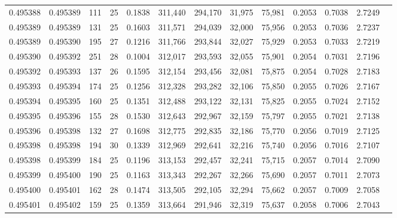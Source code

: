 \begin{tabular}{rrrrrrrrrrrrr}
0.495388 & 0.495389 & 111 &  25 &                                     0.1838 & 311,440 & 294,170 &  31,975 &  75,981 & 0.2053 & 0.7038 & 2.7249 \\
0.495389 & 0.495389 & 131 &  25 &                                     0.1603 & 311,571 & 294,039 &  32,000 &  75,956 & 0.2053 & 0.7036 & 2.7237 \\
0.495389 & 0.495390 & 195 &  27 &                                     0.1216 & 311,766 & 293,844 &  32,027 &  75,929 & 0.2053 & 0.7033 & 2.7219 \\
0.495390 & 0.495392 & 251 &  28 &                                     0.1004 & 312,017 & 293,593 &  32,055 &  75,901 & 0.2054 & 0.7031 & 2.7196 \\
0.495392 & 0.495393 & 137 &  26 &                                     0.1595 & 312,154 & 293,456 &  32,081 &  75,875 & 0.2054 & 0.7028 & 2.7183 \\
0.495393 & 0.495394 & 174 &  25 &                                     0.1256 & 312,328 & 293,282 &  32,106 &  75,850 & 0.2055 & 0.7026 & 2.7167 \\
0.495394 & 0.495395 & 160 &  25 &                                     0.1351 & 312,488 & 293,122 &  32,131 &  75,825 & 0.2055 & 0.7024 & 2.7152 \\
0.495395 & 0.495396 & 155 &  28 &                                     0.1530 & 312,643 & 292,967 &  32,159 &  75,797 & 0.2055 & 0.7021 & 2.7138 \\
0.495396 & 0.495398 & 132 &  27 &                                     0.1698 & 312,775 & 292,835 &  32,186 &  75,770 & 0.2056 & 0.7019 & 2.7125 \\
0.495398 & 0.495398 & 194 &  30 &                                     0.1339 & 312,969 & 292,641 &  32,216 &  75,740 & 0.2056 & 0.7016 & 2.7107 \\
0.495398 & 0.495399 & 184 &  25 &                                     0.1196 & 313,153 & 292,457 &  32,241 &  75,715 & 0.2057 & 0.7014 & 2.7090 \\
0.495399 & 0.495400 & 190 &  25 &                                     0.1163 & 313,343 & 292,267 &  32,266 &  75,690 & 0.2057 & 0.7011 & 2.7073 \\
0.495400 & 0.495401 & 162 &  28 &                                     0.1474 & 313,505 & 292,105 &  32,294 &  75,662 & 0.2057 & 0.7009 & 2.7058 \\
0.495401 & 0.495402 & 159 &  25 &                                     0.1359 & 313,664 & 291,946 &  32,319 &  75,637 & 0.2058 & 0.7006 & 2.7043 \\

\end{tabular}
